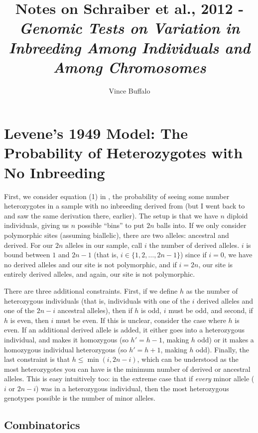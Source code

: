 \documentclass[12pt]{article}\usepackage[]{graphicx}\usepackage[]{color}
\begin{document}
\title{Notes on Schraiber et al., 2012 - \emph{Genomic Tests on Variation in Inbreeding Among Individuals and Among Chromosomes}}
\author{Vince Buffalo}
\maketitle
\section{Levene's 1949 Model: The Probability of Heterozygotes with No Inbreeding}

First, we consider equation (1) in \citet{Schraiber:2012it}, the
probability of seeing some number heterozygotes in a sample with no
inbreeding derived from \citep{Levene:1949va} (but I went back to
\citet{Haldane:1954ts} and saw the same derivation there,
earlier). The setup is that we have $n$ diploid individuals, giving us
$n$ possible ``bins'' to put $2n$ balls into. If we only consider
polymorphic sites (assuming biallelic), there are two alleles:
ancestral and derived. For our $2n$ alleles in our sample, call $i$
the number of derived alleles. $i$ is bound between $1$ and $2n-1$
(that is, $i \in \{1, 2, \ldots, 2n-1\}$) since if $i=0$, we have no
derived alleles and our site is not polymorphic, and if $i=2n$, our
site is entirely derived alleles, and again, our site is not
polymorphic.

There are three additional constraints. First, if we define $h$ as the
number of heterozygous individuals (that is, individuals with one of
the $i$ derived alleles and one of the $2n-i$ ancestral alleles), then
if $h$ is odd, $i$ must be odd, and second, if $h$ is even, then $i$
must be even. If this is unclear, consider the case where $h$ is
even. If an additional derived allele is added, it either goes into a
heterozygous individual, and makes it homozygous (so $h' = h - 1$,
making $h$ odd) or it makes a homozygous individual heterozygous (so
$h' = h + 1$, making $h$ odd). Finally, the last constraint is that $h
\le \min(i, 2n-i)$, which can be understood as the most heterozygotes
you can have is the minimum number of derived or ancestral
alleles. This is easy intuitively too: in the extreme case that if
\emph{every} minor allele ($i$ or $2n-i$) was in a heterozygous
individual, then the most heterozygous genotypes possible is the
number of minor alleles.

\subsection{Combinatorics}
\end{document}
